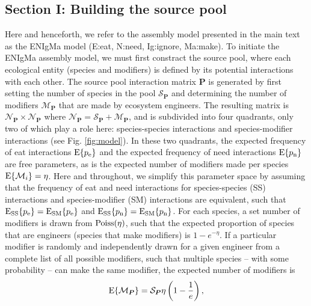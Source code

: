 \documentclass[9pt,twocolumn,twoside]{pnas-new}
\newcommand{\rr}[1]{{\rm #1}}
\begin{document}
\subsection*{Section I: Building the source pool}
Here and henceforth, we refer to the assembly model presented in the main text as the ENIgMa model (E:eat, N:need, Ig:ignore, Ma:make).
To initiate the ENIgMa assembly model, we must first constract the source pool, where each ecological entity (species and modifiers) is defined by its potential interactions with each other.
The source pool interaction matrix $\bm P$ is generated by first setting the number of species in the pool $\mathcal{S}_{\bm P}$ and determining the number of modifiers $\mathcal{M}_{\bm P}$ that are made by ecosystem engineers.
The resulting matrix is $\mathcal{N}_{\bm P}\times\mathcal{N}_{\bm P}$ where $\mathcal{N}_{\bm P}=\mathcal{S}_{\bm P}+\mathcal{M}_{\bm P}$, and is subdivided into four quadrants, only two of which play a role here: species-species interactions and species-modifier interactions (see Fig. \ref{fig:model}).
In these two quadrants, the expected frequency of eat interactions ${\rm E}\{p_\rr{e}\}$ and the expected frequency of need interactions ${\rm E}\{p_\rr{n}\}$ are free parameters, as is the expected number of modifiers made per species ${\rm E}\{\mathcal{M}_i\}=\eta$.
Here and throughout, we simplify this parameter space by assuming that the frequency of eat and need interactions for species-species (SS) interactions and species-modifier (SM) interactions are equivalent, such that ${\rm E_{SS}}\{p_\rr{e}\} = {\rm E_{SM}}\{p_\rr{e}\}$ and ${\rm E_{SS}}\{p_\rr{n}\} = {\rm E_{SM}}\{p_\rr{n}\}$.
For each species, a set number of modifiers is drawn from ${\rm Poiss}(\eta)$, such that the expected proportion of species that are engineers (species that make modifiers) is $1-{e}^{-\eta}$.
If a particular modifier is randomly and independently drawn for a given engineer from a complete list of all possible modifiers, such that multiple species -- with some probability -- can make the same modifier, the expected number of modifiers is
\begin{equation}
{\rm E}\{\mathcal{M}_{\bm P}\} = \mathcal{S}_{\bm P}\eta\left(1 - \frac{1}{{e}}\right),
\label{eq:total}
\end{equation}
\end{document}
